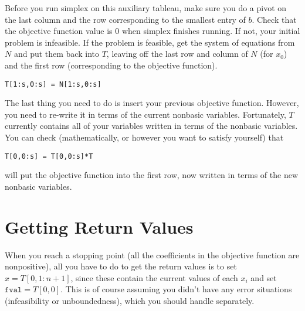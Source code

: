 Before you run simplex on this auxiliary tableau, make sure you do a pivot on the last column and the row corresponding to the smallest entry of $b$.
Check that the objective function value is 0 when simplex finishes running.
If not, your initial problem is infeasible.
If the problem is feasible, get the system of equations from $N$ and put them back into $T$, leaving off the last row and column of $N$ (for $x_0$) and the first row (corresponding to the objective function).
\begin{lstlisting}
T[1:s,0:s] = N[1:s,0:s]
\end{lstlisting}
The last thing you need to do is insert your previous objective function.
However, you need to re-write it in terms of the current nonbasic variables.
Fortunately, $T$ currently contains all of your variables written in terms of the nonbasic variables.
You can check (mathematically, or however you want to satisfy yourself) that
\begin{lstlisting}
T[0,0:s] = T[0,0:s]*T
\end{lstlisting}
will put the objective function into the first row, now written in terms of the new nonbasic variables.

\section*{Getting Return Values}

When you reach a stopping point (all the coefficients in the objective function are nonpositive), all you have to do to get the return values is to set $x = T[0,1:n+1]$, since these contain the current values of each $x_i$ and set $\mathtt{fval} = T[0,0]$.
This is of course assuming you didn't have any error situations (infeasibility or unboundedness), which you should handle separately.

